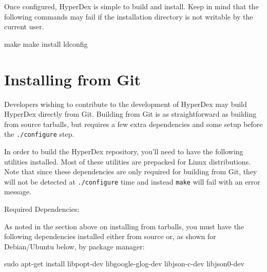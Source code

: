 Once configured, HyperDex is simple to build and install.  Keep in mind that the
following commands may fail if the installation directory is not writable by the
current user.

\begin{consolecode}
make
make install
ldconfig
\end{consolecode}

\section{Installing from Git}
\label{sec:installation:git}

Developers wishing to contribute to the development of HyperDex may build
HyperDex directly from Git.  Building from Git is as straightforward as building
from source tarballs, but requires a few extra dependencies and some setup
before the \texttt{./configure} step.

In order to build the HyperDex repository, you'll need to have the following
utilities installed.  Most of these utilities are prepacked for Linux
distributions.  Note that since these dependencies are only required for
building from Git, they will not be detected at \texttt{./configure} time and
instead \texttt{make} will fail with an error message.

Required Dependencies:

As noted in the section above on installing from tarballs, you must have the
following dependencies installed either from source or, as shown for
Debian/Ubuntu below, by package manager:

\begin{consolecode}
sudo apt-get install libpopt-dev libgoogle-glog-dev libjson-c-dev libjson0-dev
\end{consolecode}

